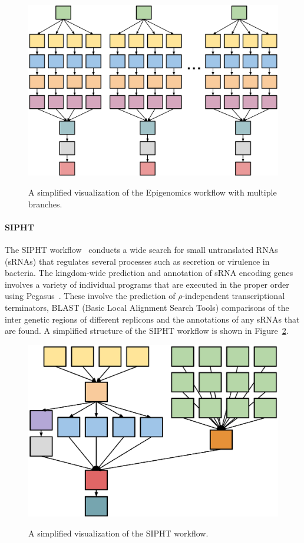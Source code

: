 \documentclass[final,5p,times,twocolumn]{elsarticle}
\begin{document}
\begin{figure}[htb]
	\centering
	\includegraphics[width=.85\linewidth]{figure17.eps} \\
	\caption{A simplified visualization of the Epigenomics workflow with multiple branches.}
	\label{fig:evaluation_shape_genome}
\end{figure}

\paragraph{\textbf{SIPHT}}
The SIPHT workflow~\cite{SIPHT} conducts a wide search for small untranslated RNAs (sRNAs) that regulates several processes such as secretion or virulence in bacteria. The kingdom-wide prediction and annotation of sRNA encoding genes involves a variety of individual programs that are executed in the proper order using Pegasus~\cite{Deelman2004}. These involve the prediction of $\rho$-independent transcriptional terminators, BLAST (Basic Local Alignment Search Tools) comparisons of the inter genetic regions of different replicons and the annotations of any sRNAs that are found. A simplified structure of the SIPHT workflow is shown in Figure~\ref{fig:evaluation_shape_sipht}. 

\begin{figure}[htb]
	\centering
	\includegraphics[width=0.6\linewidth]{figure18.eps} \\
	\caption{A simplified visualization of the SIPHT workflow.}
	\label{fig:evaluation_shape_sipht}
\end{figure}
\end{document}
